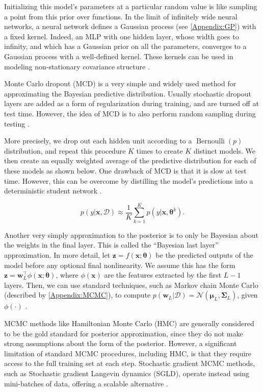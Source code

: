 \documentclass[../../../main.tex]{subfiles}
\begin{document}
Initializing this model's parameters at a particular random value is like sampling a point from this prior over functions. In the limit of infinitely wide neural networks, a neural network defines a Gaussian process (see \autoref{Appendix:GP}) with a fixed kernel. Indeed, an MLP with one hidden layer, whose width goes to infinity, and which has a Gaussian prior on all the parameters, converges to a Gaussian process with a well-defined kernel. These kernels can be used in modeling non-stationary covariance structure \autocite{Murphy2023}. 

Monte Carlo dropout (MCD) is a very simple and widely used method for approximating the Bayesian predictive distribution. Usually stochastic dropout layers are added as a form of regularization during training, and are turned off at test time. However, the idea of MCD is to also perform random sampling during testing \autocite{Murphy2023}.

More precisely, we drop out each hidden unit according to a $\operatorname{Bernoulli}(p)$ distribution, and repeat this procedure $K$ times to create $K$ distinct models. We then create an equally weighted average of the predictive distribution for each of these models as shown below. One drawback of MCD is that it is slow at test time. However, this can be overcome by distilling the model's predictions into a deterministic student network \autocite{Murphy2023}.

\begin{equation}
p(y|\bm{x},\mathcal{D}) \approx \frac{1}{K}\sum_{k=1}^{K}p(y|\bm{x},\bm{\theta}^k).
\end{equation}

Another very simply approximation to the posterior is to only be Bayesian about the weights in the final layer. This is called the ``Bayesian last layer'' approximation. In more detail, let $\bm{z}=f(\bm{x};\bm{\theta})$ be the predicted outputs of the model before any optional final nonlinearity. We assume this has the form $\bm{z}=\bm{w}_L^\top\phi(\bm{x};\bm{\theta})$, where $\phi(\bm{x})$ are the features extracted by the first $L-1$ layers. Then, we can use standard techniques, such as Markov chain Monte Carlo (described by \autoref{Appendix:MCMC}), to compute $p(\bm{w}_L|\mathcal{D})=\mathcal{N}(\bm{\mu}_L,\bm{\Sigma}_L)$, given $\phi(\cdot)$ \autocite{Murphy2023}.

MCMC methods like Hamiltonian Monte Carlo (HMC) are generally considered to be the gold standard for posterior approximation, since they do not make strong assumptions about the form of the posterior. However, a significant limitation of standard MCMC procedures, including HMC, is that they require access to the full training set at each step. Stochastic gradient MCMC methods, such as Stochastic gradient Langevin dynamics (SGLD), operate instead using mini-batches of data, offering a scalable alternative \autocite{Murphy2023}.
\end{document}
